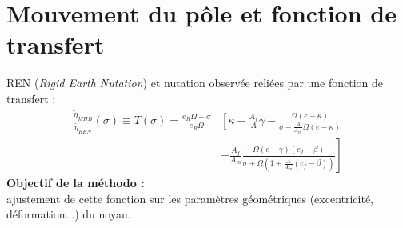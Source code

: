 \section{Mouvement du pôle et fonction de transfert}

\begin{frame}
   REN (\textit{Rigid Earth Nutation}) et nutation observée reliées par une fonction de transfert :
   \begin{align*}
     \frac{\tilde{\eta}_{MHB}}{\tilde{\eta}_{REN}}(\sigma) 
     \equiv \tilde{T}(\sigma) 
     = \frac{e_R\Omega-\sigma}{e_R\Omega} &\left[ \kappa - \frac{A_f}{A}\gamma\right.- \frac{\Omega(e-\kappa)}{\sigma-\frac{A}{A_m}\Omega(e-\kappa)}\\
     &-\left. \frac{A_f}{A_m} \frac{\Omega (e-\gamma)(e_f-\beta)}{\sigma + \Omega(1+ \frac{A}{A_m}(e_f-\beta))}\right]
   \end{align*}
   	 \textbf{Objectif de la méthodo :} 
   	\\ajustement de cette fonction sur les paramètres géométriques (excentricité, déformation...) du noyau. 
\end{frame}


\begin{frame}
  \frtt{}
\end{frame}


